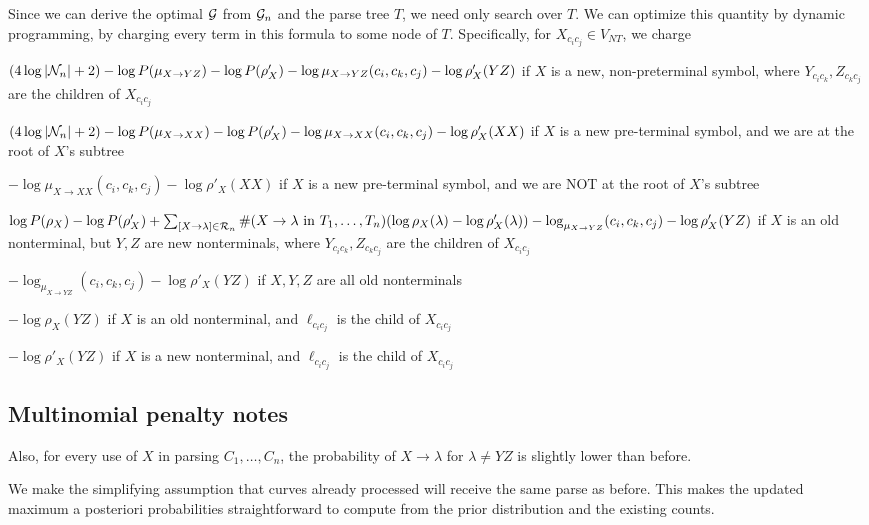 \documentclass{article}
\begin{document}
Since we can derive the optimal ${\mathcal G}$ from ${\mathcal G}_n$ and the parse
tree $T$, we need only search over $T$. We can optimize this quantity
by dynamic programming, by charging every term in this formula to some
node of $T$. Specifically, for $X_{c_i c_j}\in V_{NT}$, we charge
\bitem
\item $(4\log |{\mathcal N}_n| +2) - \log P(\mu_{X\to YZ}) - \log P(\rho'_X)
  -\log \mu_{X\to YZ}(c_i,c_k,c_j) - \log \rho'_X(YZ)$ if $X$ is a new,
  non-preterminal symbol, where $Y_{c_i c_k}, Z_{c_k c_j}$ are the
  children of $X_{c_i c_j}$
\item $(4\log |{\mathcal N}_n| +2) - \log P(\mu_{X\to XX}) - \log P(\rho'_X)
  -\log \mu_{X\to XX}(c_i,c_k,c_j) - \log \rho'_X(XX)$ if $X$ is a new
  pre-terminal symbol, and we are at the root of $X$'s subtree
\item $-\log \mu_{X\to XX}(c_i,c_k,c_j) - \log \rho'_X(XX)$ if $X$ is a new
  pre-terminal symbol, and we are NOT at the root of $X$'s subtree
\item $\log P(\rho_X) - \log P(\rho'_X) + \sum_{[X\to \lambda]\in
  {\mathcal R}_n} \#(X\to \lambda \text{ in } T_1,\dots, T_n) (\log
  \rho_X(\lambda) - \log \rho'_X(\lambda)) -\log_{\mu_{X\to YZ}} (c_i,
  c_k, c_j) - \log \rho'_X(YZ)$ if $X$ is an old nonterminal, but
  $Y,Z$ are new nonterminals, where $Y_{c_i c_k}, Z_{c_k c_j}$ are the
  children of $X_{c_i c_j}$
\item $ -\log_{\mu_{X\to YZ}} (c_i, c_k, c_j) - \log \rho'_X(YZ)$ if
  $X,Y,Z$ are all old nonterminals
\item $ - \log \rho_X(YZ)$ if
  $X$ is an old nonterminal, and $\ell_{c_i c_j}$ is the child of
  $X_{c_i c_j}$
\item $ - \log \rho'_X(YZ)$ if
  $X$ is a new nonterminal, and $\ell_{c_i c_j}$ is the child of
  $X_{c_i c_j}$
\eitem


\subsection{Multinomial penalty notes}

Also, for every use of $X$ in parsing $C_1, \dots, C_n$, the
probability of $X\to \lambda$ for $\lambda \ne YZ$ is slightly lower
than before.

We make the simplifying assumption that curves already processed will
receive the same parse as before. This makes the updated maximum a
posteriori probabilities straightforward to compute from the prior
distribution and the existing counts.
  
\end{document}
